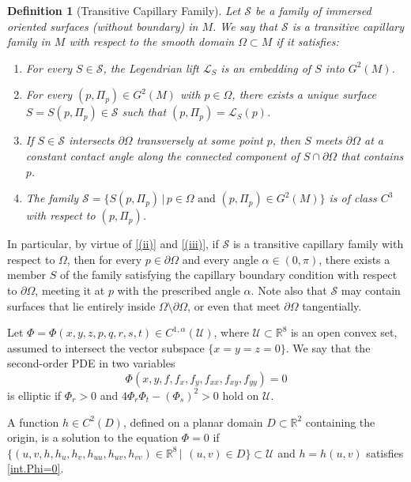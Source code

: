 \documentclass[11pt,reqno]{amsart}
\newtheorem{definition}[theorem]{Definition} %
\begin{document}
\begin{definition}[Transitive Capillary Family]\label{def.Transitive Capillary Family} Let $\mathcal{S}$ be a family of immersed oriented surfaces (without boundary) in $M$. We say that $\mathcal{S}$ is a transitive capillary family in $M$ with respect to the smooth domain $\Omega\subset M$ if it satisfies:

    \begin{enumerate}
        \item For every $S\in \mathcal{S}$, the Legendrian lift $\mathcal{L}_S$ is an embedding of $S$ into $G^2(M)$.
        \item\label{(ii)} For every $(p,\Pi_p)\in G^2(M)$ with $p\in \Omega$, there exists a unique surface $S=S(p,\Pi_p)\in \mathcal{S}$ such that $(p,\Pi_p)=\mathcal{L}_S(p)$.
        \item\label{(iii)} If $S\in\mathcal{S}$ intersects $\partial\Omega$ transversely at some point $p$, then $S$ meets $\partial\Omega$ at a constant contact angle along the connected component of $S\cap\partial\Omega$ that contains $p$.
        \item The family $\mathcal{S}=\{S(p,\Pi_p)\,|\,p\in\Omega\text{ and }(p,\Pi_p)\in G^2(M)\}$ is of class $C^3$ with respect to $(p,\Pi_p)$.
    \end{enumerate}    
\end{definition}

    In particular, by virtue of \eqref{(ii)} and \eqref{(iii)}, if $\mathcal{S}$ is a transitive capillary family with respect to $\Omega$, then for every $p\in \partial \Omega$ and every angle $\alpha\in (0,\pi)$, there exists a member $S$ of the family satisfying the capillary boundary condition with respect to $\partial \Omega$, meeting it at $p$ with the prescribed angle $\alpha$. Note also that $\mathcal{S}$ may contain surfaces that lie entirely inside $\Omega\setminus \partial \Omega$, or even that meet $\partial \Omega$ tangentially. 

   \indent Let $\Phi=\Phi(x,y,z,p,q,r,s,t)\in C^{1,\alpha}(\mathcal{U})$, where $\mathcal{U}\subset \mathbb{R}^{8}$ is an open convex set, assumed to intersect the vector subspace $\{x=y=z=0\}$. We say that the second-order PDE in two variables
\begin{equation}\label{int.Phi=0}
        \Phi(x,y,f,f_x,f_y,f_{xx},f_{xy},f_{yy})=0
\end{equation}
is elliptic if $\Phi_r>0$ and $4\Phi_r\Phi_t-(\Phi_s)^2>0$ hold on $\mathcal{U}$.

A function $h\in C^2(D)$, defined on a planar domain $D\subset\mathbb{R}^2$ containing the origin, is a solution to the equation $\Phi=0$ if $\{(u,v,h,h_u,h_v,h_{uu},h_{uv},h_{vv})\in \mathbb{R}^8\,|\,\ (u,v)\in D\}\subset\mathcal{U}$ and $h=h(u,v)$ satisfies \eqref{int.Phi=0}.
\end{document}
